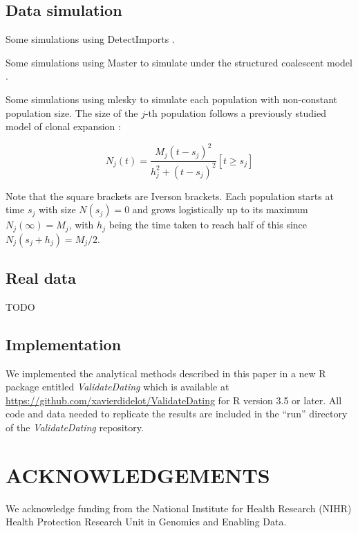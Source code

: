 \documentclass{article}
\begin{document}
\subsection*{Data simulation}

Some simulations using DetectImports \citep{Didelot2022detectimports}.

Some simulations using Master \citep{Vaughan2013} to simulate under the structured coalescent model \citep{Nordborg1997}.

Some simulations using mlesky \citep{Didelot2023mlesky} to simulate each population with non-constant population size. The size of the $j$-th population follows a previously studied model of clonal expansion \citep{Helekal2021}:

\begin{equation}
N_j(t)=\frac{M_j(t-s_j)^2}{h_j^2+(t-s_j)^2}[t \geq s_j]
\end{equation}

Note that the square brackets are Iverson brackets. Each population starts at time $s_j$ with size $N(s_j)=0$ and grows logistically up to its maximum $N_j(\infty)=M_j$, with $h_j$ being the time taken to reach half of this since $N_j(s_j+h_j)=M_j/2$. 


\subsection*{Real data}

TODO

\subsection*{Implementation}

We implemented the analytical methods described in this paper in a 
new R package entitled \emph{ValidateDating} which is available
at \url{https://github.com/xavierdidelot/ValidateDating} for R version 3.5 or later. 
All code and data needed to replicate the results are included in the ``run'' directory of the \emph{ValidateDating} repository.

\section*{ACKNOWLEDGEMENTS}

We acknowledge funding from the National Institute for Health Research (NIHR) Health Protection Research Unit in Genomics and Enabling Data.

\newpage


%
\end{document}
